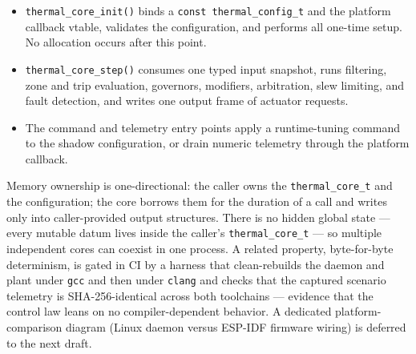 \begin{itemize}[leftmargin=*]
    \item \texttt{thermal\_core\_init()} binds a \texttt{const thermal\_config\_t} and the platform callback vtable, validates the configuration, and performs all one-time setup. No allocation occurs after this point.
    \item \texttt{thermal\_core\_step()} consumes one typed input snapshot, runs filtering, zone and trip evaluation, governors, modifiers, arbitration, slew limiting, and fault detection, and writes one output frame of actuator requests.
    \item The command and telemetry entry points apply a runtime-tuning command to the shadow configuration, or drain numeric telemetry through the platform callback.
\end{itemize}

Memory ownership is one-directional: the caller owns the \texttt{thermal\_core\_t} and the configuration; the core borrows them for the duration of a call and writes only into caller-provided output structures. There is no hidden global state --- every mutable datum lives inside the caller's \texttt{thermal\_core\_t} --- so multiple independent cores can coexist in one process. A related property, byte-for-byte determinism, is gated in CI by a harness that clean-rebuilds the daemon and plant under \texttt{gcc} and then under \texttt{clang} and checks that the captured scenario telemetry is SHA-256-identical across both toolchains --- evidence that the control law leans on no compiler-dependent behavior. A dedicated platform-comparison diagram (Linux daemon versus ESP-IDF firmware wiring) is deferred to the next draft.

\endinput
